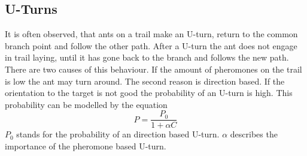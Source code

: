 \subsection{U-Turns}
It is often observed, that ants on a trail make an U-turn, return to the common branch point and follow the other path. After a U-turn the ant does not engage in trail laying, until it has gone back to the branch and follows the new path. There are two causes of this behaviour. If the amount of pheromones on the trail is low the ant may turn around. The second reason is direction based. If the orientation to the target is not good the probability of an U-turn is high. This probability can be modelled by the equation
$$P=\frac{P_0}{1+\alpha C}$$
$P_0$ stands for the probability of an direction based U-turn. $\alpha$ describes the importance of the pheromone based U-turn.